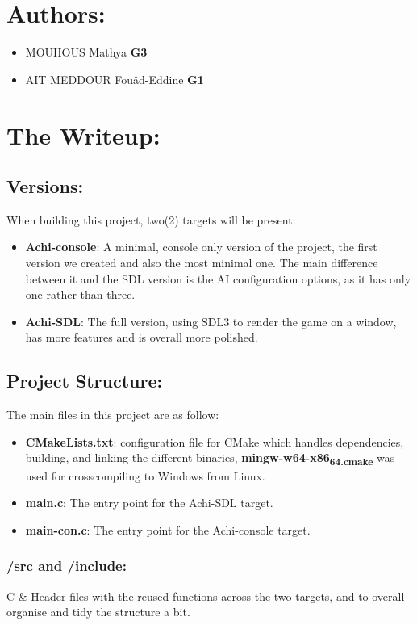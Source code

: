\documentclass[11pt]{article}
\begin{document}
\section{Authors:}
\label{sec:org246efe0}
\begin{itemize}
\item MOUHOUS Mathya \textbf{G3}
\item AIT MEDDOUR Fouâd-Eddine \textbf{G1}
\end{itemize}
\section{The Writeup:}
\label{sec:org65c0dcb}
\subsection{Versions:}
\label{sec:org5878296}
When building this project, two(2) targets will be present:
\begin{itemize}
\item \textbf{Achi-console}: A minimal, console only version of the project, the first version we created and also the most minimal one. The main difference between it and the SDL version is the AI configuration options, as it has only one rather than three.

\item \textbf{Achi-SDL}: The full version, using SDL3 to render the game on a window, has more features and is overall more polished.
\end{itemize}
\subsection{Project Structure:}
\label{sec:org16d66e0}
The main files in this project are as follow:

\begin{itemize}
\item \textbf{CMakeLists.txt}: configuration file for CMake which handles dependencies, building, and linking the different binaries, \textbf{mingw-w64-x86\textsubscript{64.cmake}} was used for crosscompiling to Windows from Linux.
\item \textbf{main.c}: The entry point for the Achi-SDL target.
\item \textbf{main-con.c}: The entry point for the Achi-console target.
\end{itemize}
\subsubsection{/src and /include:}
\label{sec:org861c05e}
C \& Header files with the reused functions across the two targets, and to overall organise and tidy the structure a bit.
\end{document}
